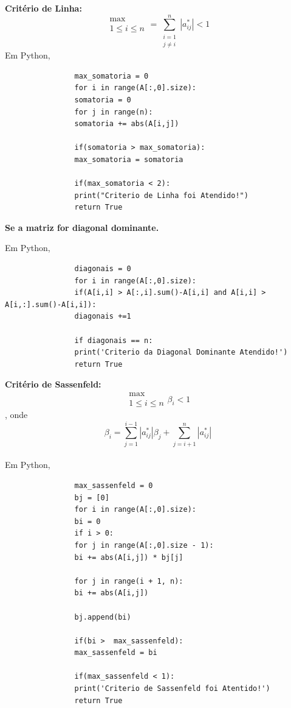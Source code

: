\documentclass[
12pt,				%
openright,			%
twoside,			%
a4paper,			%
english,			%
french,				%
spanish,			%
brazil				%
]{abntex2_new}
\begin{document}
		
		\begin{alineas}
			\item{\textbf{Critério de Linha:}
				$$\substack{\max \\ 1 \leq i \leq n} = \sum_{\substack{i = 1 \\ j \neq i}}^{n}
				|a_{ij}^{*} | < 1 $$
				Em Python,
				\begin{lstlisting}
				max_somatoria = 0
				for i in range(A[:,0].size):
				somatoria = 0
				for j in range(n):
				somatoria += abs(A[i,j])
				
				if(somatoria > max_somatoria):
				max_somatoria = somatoria
				
				if(max_somatoria < 2): 
				print("Criterio de Linha foi Atendido!")
				return True\end{lstlisting}
			}
			
			\item{\textbf{Se a matriz for diagonal dominante.}
				
				Em Python,
				\begin{lstlisting}
				diagonais = 0
				for i in range(A[:,0].size):
				if(A[i,i] > A[:,i].sum()-A[i,i] and A[i,i] > A[i,:].sum()-A[i,i]):
				diagonais +=1
				
				if diagonais == n:
				print('Criterio da Diagonal Dominante Atendido!')
				return True
				\end{lstlisting}
				
				
				
			}
			\item{\textbf{Critério de Sassenfeld:}
				$$\substack{\max \\ 1 \leq i \leq n}  \beta_i < 1 $$\hspace{25pt}, onde
				$$\beta_i = \sum_{j=1}^{i-1} |a_{ij}^{*} | \beta_j + \sum_{j = i + 1}^{n}  |
				a_{ij}^{*}|$$\\
				
				Em Python,
				\begin{lstlisting}
				max_sassenfeld = 0
				bj = [0]
				for i in range(A[:,0].size):
				bi = 0
				if i > 0:
				for j in range(A[:,0].size - 1):
				bi += abs(A[i,j]) * bj[j]
				
				for j in range(i + 1, n):
				bi += abs(A[i,j])
				
				bj.append(bi)
				
				if(bi >  max_sassenfeld):
				max_sassenfeld = bi
				
				if(max_sassenfeld < 1):
				print('Criterio de Sassenfeld foi Atentido!')
				return True\end{lstlisting}  
			}
		\end{alineas}
		
\end{document}

